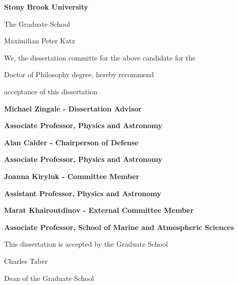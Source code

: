 \documentclass[12pt]{article}
\begin{document}
\newpage
{}
\setcounter{page}{2}

\centerline{\bf{Stony Brook University}}
\vspace*{1\baselineskip}
\centerline{The Graduate School}
\vspace*{2\baselineskip}
\centerline{Maximilian Peter Katz}
\vspace*{2\baselineskip}
\centerline{We, the dissertation committe for the above candidate for the}
\vspace*{1\baselineskip}
\centerline{Doctor of Philosophy degree, hereby recommend}
\vspace*{1\baselineskip}
\centerline{acceptance of this dissertation}
\vspace*{2\baselineskip}
\centerline{\bf{Michael Zingale - Dissertation Advisor}}
\centerline{\bf{Associate Professor, Physics and Astronomy}}
\vspace*{2\baselineskip}
\centerline{\bf{Alan Calder - Chairperson of Defense}}
\centerline{\bf{Associate Professor, Physics and Astronomy}}
\vspace*{2\baselineskip}
\centerline{\bf{Joanna Kiryluk - Committee Member}}
\centerline{\bf{Assistant Professor, Physics and Astronomy}} 
\vspace*{2\baselineskip}
\centerline{\bf{Marat Khairoutdinov - External Committee Member}}
\centerline{\bf{Associate Professor, School of Marine and Atmospheric Sciences}}
\vspace*{2\baselineskip}
\centerline{This dissertation is accepted by the Graduate School}
\vspace*{3\baselineskip}
\centerline{Charles Taber}
\centerline{Dean of the Graduate School}

\newpage
\end{document}
